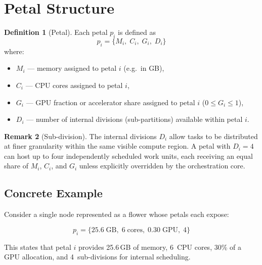 \documentclass[11pt, a4paper, oneside]{article}
\theoremstyle{definition}
\newtheorem{definition}{Definition}[section]
\newtheorem{remark}[definition]{Remark}
\begin{document}
\section{Petal Structure}

\begin{definition}[Petal]
Each petal $p_i$ is defined as
\begin{equation}
  p_i = \bigl\{ M_i,\; C_i,\; G_i,\; D_i \bigr\}
\end{equation}
where:
\begin{itemize}
  \item $M_i$ — memory assigned to petal $i$ (e.g.\ in GB),
  \item $C_i$ — CPU cores assigned to petal $i$,
  \item $G_i$ — GPU fraction or accelerator share assigned to petal $i$
        ($0 \le G_i \le 1$),
  \item $D_i$ — number of internal divisions (sub-partitions) available
        within petal $i$.
\end{itemize}
\end{definition}

\begin{remark}[Sub-division]
The internal divisions $D_i$ allow tasks to be distributed at finer
granularity within the same visible compute region.  A petal with $D_i = 4$
can host up to four independently scheduled work units, each receiving an
equal share of $M_i$, $C_i$, and $G_i$ unless explicitly overridden by the
orchestration core.
\end{remark}

\subsection{Concrete Example}

Consider a single node represented as a flower whose petals each expose:

\begin{equation}
  p_i = \bigl\{ 25.6\;\text{GB},\; 6\;\text{cores},\; 0.30\;\text{GPU},\; 4 \bigr\}
\end{equation}

This states that petal $i$ provides 25.6\,GB of memory, 6~CPU cores, 30\% of
a GPU allocation, and 4~sub-divisions for internal scheduling.

\end{document}

